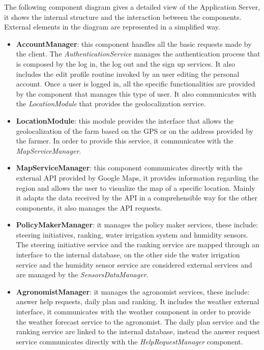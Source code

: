 \documentclass[table, 12pt]{article}
\begin{document}
The following component diagram gives a detailed view of the Application Server, it shows the internal structure and the interaction between the components.
External elements in the diagram are represented in a simplified way.
\begin{itemize}
    \item \textbf{AccountManager}: this component handles all the basic requests made by the client.
    The \textit{AuthenticationService} manages the authentication process that is composed by the log in, the log out and the sign up services. 
    It also includes the edit profile routine invoked by an user editing the personal account.
    Once a user is logged in, all the specific functionalities are provided by the component that manages this type of user.
    It also communicates with the \textit{LocationModule} that provides the geolocalization service.
    \item \textbf{LocationModule}: this module provides the interface that allows the geolocalization of the farm based on the GPS or on the address provided by the farmer.
    In order to provide this service, it communicates with the \textit{MapServiceManager}.
    \item \textbf{MapServiceManager}: this component communicates directly with the external API provided by Google Maps, it provides information regarding the region and allows the user to visualize the map of a specific location.
    Mainly it adapts the data received by the API in a comprehensible way for the other components, it also manages the API requests.
    \item \textbf{PolicyMakerManager}: it manages the policy maker services, these include: steering initiatives, ranking, water irrigation system and humidity sensors.
    The steering initiative service and the ranking service are mapped through an interface to the internal database, on the other side the water irrigation service and the humidity sensor service are considered external services and are managed by the \textit{SensorsDataManager}.
    \item \textbf{AgronomistManager}: it manages the agronomist services, these include: answer help requests, daily plan and ranking.
    It includes the weather external interface, it communicates with the weather component in order to provide the weather forecast service to the agronomist.
    The daily plan service and the ranking service are linked to the internal database, instead the answer request service communicates directly with the \textit{HelpRequestManager} component.

\end{itemize}
\end{document}
